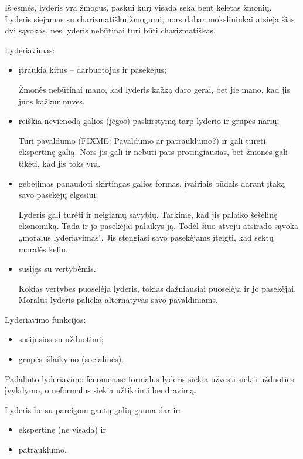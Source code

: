 Iš esmės, lyderis yra žmogus, paskui kurį visada seka bent keletas žmonių.
Lyderis siejamas su charizmatišku žmogumi, nors dabar mokslininkai
atsieja šias dvi sąvokas, nes lyderis nebūtinai turi būti charizmatiškas.

Lyderiavimas:
\begin{itemize}
  \item įtraukia kitus – darbuotojus ir pasekėjus;
    \begin{note}
      Žmonės nebūtinai mano, kad lyderis kažką daro gerai, bet jie mano,
      kad jis juos kažkur nuves.
    \end{note}
  \item reiškia nevienodą galios (jėgos) paskirstymą tarp lyderio ir
    grupės narių;
    \begin{note}
      Turi pavaldumo (FIXME: Pavaldumo ar patrauklumo?) ir gali turėti
      ekspertinę galią. Nors jis gali ir nebūti pats protingiausias,
      bet žmonės gali tikėti, kad jis toks yra.
    \end{note}
  \item gebėjimas panaudoti skirtingas galios formas, įvairiais būdais
    darant įtaką savo pasekėjų elgesiui;
    \begin{note}
      Lyderis gali turėti ir neigiamų savybių. Tarkime, kad jis palaiko
      šešėlinę ekonomiką. Tada ir jo pasekėjai palaikys ją. Todėl šiuo
      atveju atsirado sąvoka „moralus lyderiavimas“. Jis stengiasi
      savo pasekėjams įteigti, kad sektų moralės keliu.
    \end{note}
  \item susijęs su vertybėmis.
    \begin{note}
      Kokias vertybes puoselėja lyderis, tokias dažniausiai puoselėja
      ir jo pasekėjai. Moralus lyderis palieka alternatyvas savo
      pavaldiniams.
    \end{note}
\end{itemize}

Lyderiavimo funkcijos:
\begin{itemize}
  \item susijusios su užduotimi;
  \item grupės išlaikymo (socialinės).
\end{itemize}

Padalinto lyderiavimo fenomenas: formalus lyderis siekia užvesti siekti
užduoties įvykdymo, o neformalus siekia užtikrinti bendravimą.

Lyderis be su pareigom gautų galių gauna dar ir:
\begin{itemize}
  \item ekspertinę (ne visada) ir
  \item patrauklumo.
\end{itemize}

